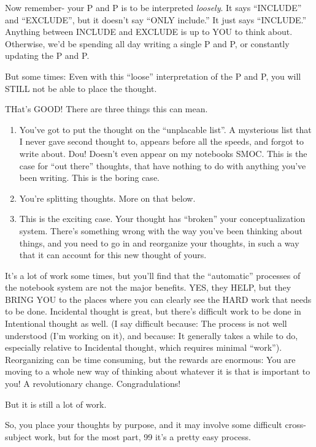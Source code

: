 \documentclass[oneside]{book}
\begin{document}
Now remember- your P and P is to be interpreted \emph{loosely}. It says
``INCLUDE'' and ``EXCLUDE'', but it doesn't say ``ONLY include.'' It just
says ``INCLUDE.'' Anything between INCLUDE and EXCLUDE is up to YOU to
think about. Otherwise, we'd be spending all day writing a single P and P,
or constantly updating the P and P.

But some times: Even with this ``loose'' interpretation of the P and P, you
will STILL not be able to place the thought.

THat's GOOD! There are three things this can mean.

\begin{enumerate}
\item You've got to put the thought on the ``unplacable list''. A
   mysterious list that I never gave second thought to, appears before
   all the speeds, and forgot to write about. Dou! Doesn't even appear
   on my notebooks SMOC.
   This is the case for ``out there'' thoughts, that have nothing to do
   with anything you've been writing.
   This is the boring case.
\item You're splitting thoughts. More on that below.
\item This is the exciting case. Your thought has ``broken'' your
   conceptualization system. There's something wrong with the way
   you've been thinking about things, and you need to go in and
   reorganize your thoughts, in such a way that it can account for
   this new thought of yours.
\end{enumerate}

It's a lot of work some times, but you'll find that the ``automatic''
processes of the notebook system are not the major benefits. YES, they
HELP, but they BRING YOU to the places where you can clearly see the
HARD work that needs to be done. Incidental thought is great, but
there's difficult work to be done in Intentional thought as well. (I
say difficult because: The process is not well understood (I'm working
on it), and because: It generally takes a while to do, especially
relative to Incidental thought, which requires minimal
``work''). Reorganizing can be time consuming, but the rewards are
enormous: You are moving to a whole new way of thinking about whatever
it is that is important to you! A revolutionary
change. Congradulations!

But it is still a lot of work.

So, you place your thoughts by purpose, and it may involve some
difficult cross-subject work, but for the most part, 99%
it's a pretty easy process.
\end{document}
